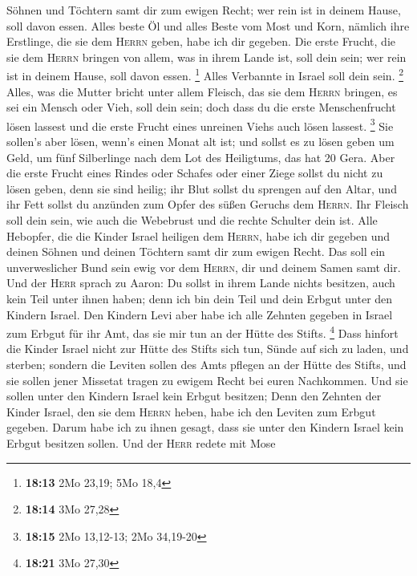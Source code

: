 Söhnen und Töchtern samt dir zum ewigen Recht; wer rein ist in deinem
Hause, soll davon essen.  Alles beste Öl und alles Beste
vom Most und Korn, nämlich ihre Erstlinge, die sie dem \textsc{Herrn}
geben, habe ich dir gegeben.  Die erste Frucht, die sie
dem \textsc{Herrn} bringen von allem, was in ihrem Lande ist, soll dein
sein; wer rein ist in deinem Hause, soll davon essen. \footnote{\textbf{18:13}
  2Mo 23,19; 5Mo 18,4}  Alles Verbannte in Israel soll
dein sein. \footnote{\textbf{18:14} 3Mo 27,28}  Alles,
was die Mutter bricht unter allem Fleisch, das sie dem \textsc{Herrn}
bringen, es sei ein Mensch oder Vieh, soll dein sein; doch dass du die
erste Menschenfrucht lösen lassest und die erste Frucht eines unreinen
Viehs auch lösen lassest. \footnote{\textbf{18:15} 2Mo 13,12-13; 2Mo
  34,19-20}  Sie sollen's aber lösen, wenn's einen Monat
alt ist; und sollst es zu lösen geben um Geld, um fünf Silberlinge nach
dem Lot des Heiligtums, das hat 20 Gera.  Aber die erste
Frucht eines Rindes oder Schafes oder einer Ziege sollst du nicht zu
lösen geben, denn sie sind heilig; ihr Blut sollst du sprengen auf den
Altar, und ihr Fett sollst du anzünden zum Opfer des süßen Geruchs dem
\textsc{Herrn}.  Ihr Fleisch soll dein sein, wie auch die
Webebrust und die rechte Schulter dein ist.  Alle
Hebopfer, die die Kinder Israel heiligen dem \textsc{Herrn}, habe ich
dir gegeben und deinen Söhnen und deinen Töchtern samt dir zum ewigen
Recht. Das soll ein unverweslicher Bund sein ewig vor dem
\textsc{Herrn}, dir und deinem Samen samt dir.  Und der
\textsc{Herr} sprach zu Aaron: Du sollst in ihrem Lande nichts besitzen,
auch kein Teil unter ihnen haben; denn ich bin dein Teil und dein Erbgut
unter den Kindern Israel.  Den Kindern Levi aber habe ich
alle Zehnten gegeben in Israel zum Erbgut für ihr Amt, das sie mir tun
an der Hütte des Stifts. \footnote{\textbf{18:21} 3Mo 27,30}
 Dass hinfort die Kinder Israel nicht zur Hütte des
Stifts sich tun, Sünde auf sich zu laden, und sterben; 
sondern die Leviten sollen des Amts pflegen an der Hütte des Stifts, und
sie sollen jener Missetat tragen zu ewigem Recht bei euren Nachkommen.
Und sie sollen unter den Kindern Israel kein Erbgut besitzen;
 Denn den Zehnten der Kinder Israel, den sie dem
\textsc{Herrn} heben, habe ich den Leviten zum Erbgut gegeben. Darum
habe ich zu ihnen gesagt, dass sie unter den Kindern Israel kein Erbgut
besitzen sollen.  Und der \textsc{Herr} redete mit Mose
